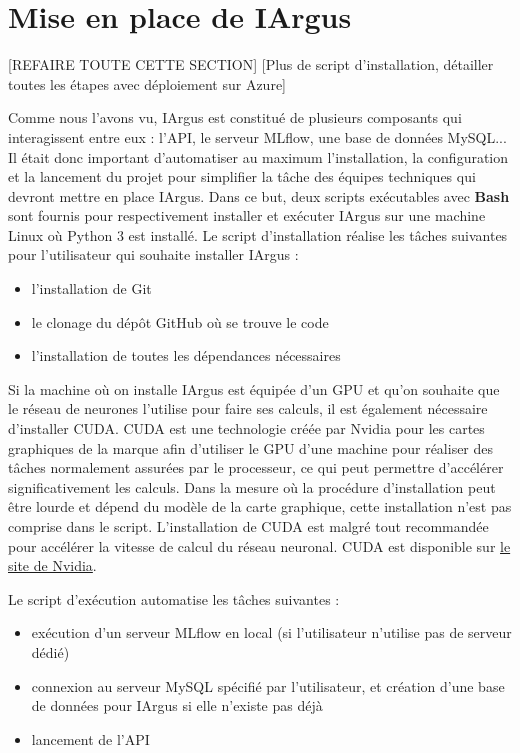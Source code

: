 \documentclass[french]{article}
\begin{document}
    \section{Mise en place de IArgus} \label{mise_en_place}

    [REFAIRE TOUTE CETTE SECTION]
    [Plus de script d'installation, détailler toutes les étapes avec déploiement sur Azure]

    Comme nous l'avons vu, IArgus est constitué de plusieurs composants qui interagissent entre eux : l'API, le serveur MLflow, une base de données MySQL... Il était donc important d'automatiser au maximum l'installation, la configuration et la lancement du projet pour simplifier la tâche des équipes techniques qui devront mettre en place IArgus. Dans ce but, deux scripts exécutables avec \textbf{Bash} sont fournis pour respectivement installer et exécuter IArgus sur une machine Linux où Python 3 est installé. Le script d'installation réalise les tâches suivantes pour l'utilisateur qui souhaite installer IArgus :
    \begin{itemize}
        \item l'installation de Git
        \item le clonage du dépôt GitHub où se trouve le code
        \item l'installation de toutes les dépendances nécessaires
    \end{itemize} 

    Si la machine où on installe IArgus est équipée d'un GPU et qu'on souhaite que le réseau de neurones l'utilise pour faire ses calculs, il est également nécessaire d'installer CUDA. CUDA est une technologie créée par Nvidia pour les cartes graphiques de la marque afin d'utiliser le GPU d'une machine pour réaliser des tâches normalement assurées par le processeur, ce qui peut permettre d'accélérer significativement les calculs. Dans la mesure où la procédure d'installation peut être lourde et dépend du modèle de la carte graphique, cette installation n'est pas comprise dans le script. L'installation de CUDA est malgré tout recommandée pour accélérer la vitesse de calcul du réseau neuronal. CUDA est disponible sur \href{https://developer.nvidia.com/cuda-downloads}{le site de Nvidia}.

    Le script d'exécution automatise les tâches suivantes :
    \begin{itemize}
        \item exécution d'un serveur MLflow en local (si l'utilisateur n'utilise pas de serveur dédié)
        \item connexion au serveur MySQL spécifié par l'utilisateur, et création d'une base de données pour IArgus si elle n'existe pas déjà
        \item lancement de l'API
    \end{itemize}
\end{document}
